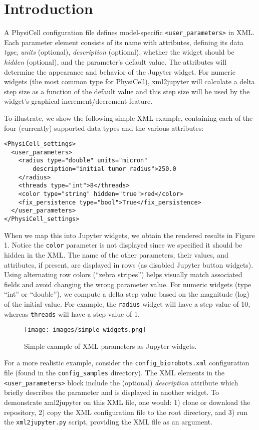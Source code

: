 \documentclass[10pt,letterpaper]{article}
\begin{document}
\section*{Introduction}
A PhysiCell configuration file defines model-specific
\texttt{\textless{}user\_parameters\textgreater{}} in XML. Each
parameter element consists of its name with attributes, defining its
data \emph{type}, \emph{units} (optional), \emph{description}
(optional), whether the widget should be \emph{hidden} (optional), and
the parameter's default value. The attributes will determine the
appearance and behavior of the Jupyter widget. For numeric widgets (the
most common type for PhysiCell), xml2jupyter will calculate a delta step
size as a function of the default value and this step size will be used
by the widget's graphical increment/decrement feature.

To illustrate, we show the following simple XML example, containing each
of the four (currently) supported data types and the various attributes:

\begin{verbatim}
<PhysiCell_settings>
  <user_parameters>
    <radius type="double" units="micron"
        description="initial tumor radius">250.0
    </radius>
    <threads type="int">8</threads>
    <color type="string" hidden="true">red</color>
    <fix_persistence type="bool">True</fix_persistence>
  </user_parameters>
</PhysiCell_settings>
\end{verbatim}

When we map this into Jupyter widgets, we obtain the rendered results in
Figure 1. Notice the \texttt{color} parameter is not displayed since we
specified it should be hidden in the XML. The name of the other
parameters, their values, and attributes, if present, are displayed in
rows (as disabled Jupyter button widgets). Using alternating row colors
(``zebra stripes'') helps visually match associated fields and avoid
changing the wrong parameter value. For numeric widgets (type ``int'' or
``double''), we compute a delta step value based on the magnitude (log)
of the initial value. For example, the \texttt{radius} widget will have
a step value of 10, whereas \texttt{threads} will have a step value of
1.

\begin{figure}[H]
\centering
\texttt{[image: images/simple\_widgets.png]}
\caption{Simple example of XML parameters as Jupyter widgets.}
\end{figure}

For a more realistic example, consider the
\texttt{config\_biorobots.xml} configuration file (found in the
\texttt{config\_samples} directory). The XML elements in the
\texttt{\textless{}user\_parameters\textgreater{}} block include the
(optional) \emph{description} attribute which briefly describes the
parameter and is displayed in another widget. To demonstrate xml2jupyter
on this XML file, one would: 1) clone or download the repository, 2)
copy the XML configuration file to the root directory, and 3) run the
\texttt{xml2jupyter.py} script, providing the XML file as an argument.
\end{document}
